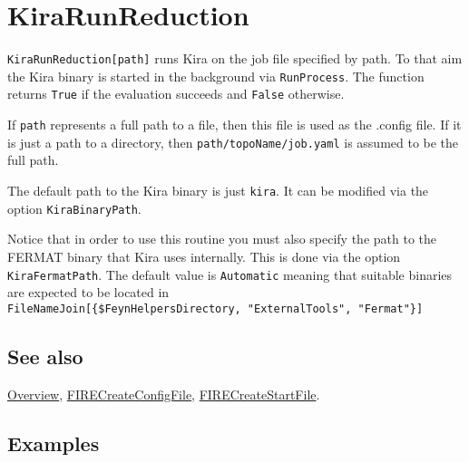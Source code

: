\documentclass[../FeynHelpersManual.tex]{subfiles}
\begin{document}
\hypertarget{kirarunreduction}{
\section{KiraRunReduction}\label{kirarunreduction}}

\texttt{KiraRunReduction[\allowbreak{}path]} runs Kira on the job file
specified by path. To that aim the Kira binary is started in the
background via \texttt{RunProcess}. The function returns \texttt{True}
if the evaluation succeeds and \texttt{False} otherwise.

If \texttt{path} represents a full path to a file, then this file is
used as the .config file. If it is just a path to a directory, then
\texttt{path/topoName/job.yaml} is assumed to be the full path.

The default path to the Kira binary is just \texttt{kira}. It can be
modified via the option \texttt{KiraBinaryPath}.

Notice that in order to use this routine you must also specify the path
to the FERMAT binary that Kira uses internally. This is done via the
option \texttt{KiraFermatPath}. The default value is \texttt{Automatic}
meaning that suitable binaries are expected to be located in
\texttt{FileNameJoin[\allowbreak{}\{\allowbreak{}\$FeynHelpersDirectory,\ \allowbreak{}"ExternalTools",\ \allowbreak{}"Fermat"\}]}

\subsection{See also}

\hyperlink{toc}{Overview},
\hyperlink{firecreateconfigfile}{FIRECreateConfigFile},
\hyperlink{firecreatestartfile}{FIRECreateStartFile}.

\subsection{Examples}

\begin{Shaded}
\begin{Highlighting}[]
\OperatorTok{[}\OperatorTok{[\{}\OperatorTok{,} \OperatorTok{,} \OperatorTok{,} \OperatorTok{\}],}\OtherTok{{-}\textgreater{}} \OperatorTok{]}
\end{Highlighting}
\end{Shaded}
\end{document}
